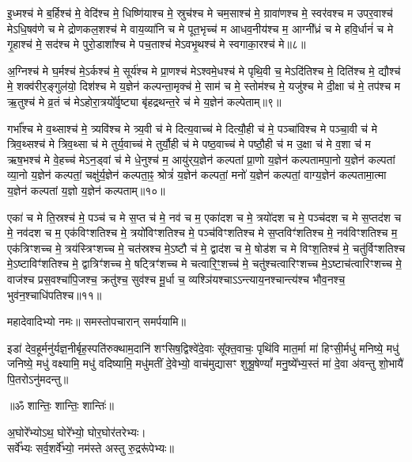 इ॒ध्मश्च॑ मे ब॒र्हिश्च॑ मे॒ वेदि॑श्च मे॒ धिष्णि॑याश्च मे॒ स्रुच॑श्च मे चम॒साश्च॑ मे॒ ग्रावा॑णश्च मे॒ स्वर॑वश्च म उपर॒वाश्च॑ मेऽधि॒षव॑णे च मे द्रोणकल॒शश्च॑ मे वाय॒व्या॑नि च मे पूत॒भृच्च॑ म आधव॒नीय॑श्च म॒ आग्नी᳚ध्रं च मे हवि॒र्धानं॑ च मे गृ॒हाश्च॑ मे॒ सद॑श्च मे पुरो॒डाशा᳚श्च मे पच॒ताश्च॑ मेऽवभृ॒थश्च॑ मे स्वगाका॒रश्च॑ मे॥८॥

अ॒ग्निश्च॑ मे घ॒र्मश्च॑ मे॒ऽर्कश्च॑ मे॒ सूर्य॑श्च मे प्रा॒णश्च॑ मेऽश्वमे॒धश्च॑ मे पृथि॒वी च॒ मेऽदि॑तिश्च मे॒ दिति॑श्च मे॒ द्यौश्च॑ मे॒ शक्व॑रीर॒ङ्गुल॑यो॒ दिश॑श्च मे य॒ज्ञेन॑ कल्पन्ता॒मृक्च॑ मे॒ साम॑ च मे॒ स्तोम॑श्च मे॒ यजु॑श्च मे दी॒क्षा च॑ मे॒ तप॑श्च म ऋ॒तुश्च॑ मे व्र॒तं च॑ मेऽहोरा॒त्रयो᳚र्वृ॒ष्ट्या बृ॑हद्रथन्त॒रे च॑ मे य॒ज्ञेन॑ कल्पेताम्॥९॥

गर्भा᳚श्च मे व॒थ्साश्च॑ मे॒ त्र्यवि॑श्च मे त्र्य॒वी च॑ मे दित्य॒वाच्च॑ मे दित्यौ॒ही च॑ मे॒ पञ्चा॑विश्च मे पञ्चा॒वी च॑ मे त्रिव॒थ्सश्च॑ मे त्रिव॒थ्सा च॑ मे तुर्य॒वाच्च॑ मे तुर्यौ॒ही च॑ मे पष्ठ॒वाच्च॑ मे पष्ठौ॒ही च॑ म उ॒क्षा च॑ मे व॒शा च॑ म ऋष॒भश्च॑ मे वे॒हच्च॑ मेऽन॒ड्वां च॑ मे धे॒नुश्च॑ म॒ आयु॑र्‌य॒ज्ञेन॑ कल्पतां प्रा॒णो य॒ज्ञेन॑ कल्पतामपा॒नो य॒ज्ञेन॑ कल्पतां व्या॒नो य॒ज्ञेन॑ कल्पतां॒ चक्षु॑र्य॒ज्ञेन॑ कल्पता॒ꣴ॒ श्रोत्रं॑ य॒ज्ञेन॑ कल्पतां॒ मनो॑ य॒ज्ञेन॑ कल्पतां॒ वाग्य॒ज्ञेन॑ कल्पतामा॒त्मा य॒ज्ञेन॑ कल्पतां य॒ज्ञो य॒ज्ञेन॑ कल्पताम्॥१०॥

एका॑ च मे ति॒स्रश्च॑ मे॒ पञ्च॑ च मे स॒प्त च॑ मे॒ नव॑ च म॒ एका॑दश च मे॒ त्रयो॑दश च मे॒ पञ्च॑दश च मे स॒प्तद॑श च मे॒ नव॑दश च म॒ एक॑विꣳशतिश्च मे॒ त्रयो॑विꣳशतिश्च मे॒ पञ्च॑विꣳशतिश्च मे स॒प्तविꣳ॑शतिश्च मे॒ नव॑विꣳशतिश्च म॒ एक॑त्रिꣳशच्च मे॒ त्रय॑स्त्रिꣳशच्च मे॒ चत॑स्रश्च मे॒ऽष्टौ च॑ मे॒ द्वाद॑श च मे॒ षोड॑श च मे विꣳश॒तिश्च॑ मे॒ चतु॑र्विꣳशतिश्च मे॒ऽष्टाविꣳ॑शतिश्च मे॒ द्वात्रिꣳ॑शच्च मे॒ षट्त्रिꣳ॑शच्च मे चत्वारि॒ꣳ॒शच्च॑ मे॒ चतु॑श्चत्वारिꣳशच्च मे॒ऽष्टाच॑त्वारिꣳशच्च मे॒ वाज॑श्च प्रस॒वश्चा॑पि॒जश्च॒ क्रतु॑श्च॒ सुव॑श्च मू॒र्धा च॒ व्यश्ञि॑यश्चा\-ऽऽन्त्याय॒नश्चान्त्य॑श्च भौव॒नश्च॒ भुव॑न॒श्चाधि॑पतिश्च॥११॥

महादेवादिभ्यो नमः॥ समस्तोपचारान् समर्पयामि॥

इडा॑ देव॒हूर्मनु॑र्यज्ञ॒नीर्बृह॒स्पति॑रुक्थाम॒दानि॑ शꣳसिष॒द्विश्वे॑दे॒वाः सू᳚क्त॒वाचः॒ पृथि॑वि मात॒र्मा मा॑ हिꣳसी॒र्मधु॑ मनिष्ये॒ मधु॑ जनिष्ये॒ मधु॑ वक्ष्यामि॒ मधु॑ वदिष्यामि॒ मधु॑मतीं दे॒वेभ्यो॒ वाच॑मुद्यासꣳ शुश्रू॒षेण्यां᳚ मनु॒ष्ये᳚भ्य॒स्तं मा॑ दे॒वा अ॑वन्तु शो॒भायै॑ पि॒तरोऽनु॑मदन्तु॥

\centerline{॥ॐ शान्तिः॒ शान्तिः॒ शान्तिः॑॥}

{\small\closesection}

अ॒घोरे᳚भ्योऽथ॒ घोरे᳚भ्यो॒ घोर॒घोर॑तरेभ्यः।\\
सर्वे᳚भ्यः सर्व॒शर्वे᳚भ्यो॒ नम॑स्ते अस्तु रु॒द्ररू॑पेभ्यः॥


